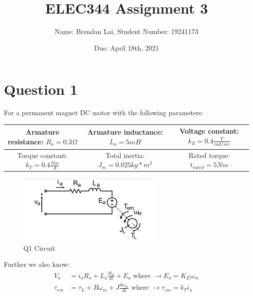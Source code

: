 \documentclass{article}
\title{ELEC344 Assignment 3}
\author{Name: Brendan Lai, Student Number: 19241173}
\date{Due: April 18th, 2021}
\begin{document}
\maketitle
  
\tableofcontents


\section{Question 1}
For a permanent magnet DC motor with the following parameters:
\begin{center}
 \begin{tabular}{| c | c | c |} 
 \hline
 Armature resistance: $R_a = 0.3 \Omega$ & Armature inductance: $L_a = 5mH$ & Voltage constant: $k_E = 0.4 \frac{V}{rad/sec}$ \\ 
 \hline
 Torque constant: $k_T = 0.4 \frac{Nm}{A}$ & Total inertia: $J_m = 0.025 kg*m^2$ & Rated torque: $t_{rated} = 5Nm$\\
 \hline
\end{tabular}
\end{center}
\begin{figure}[H]
    \centering
    \includegraphics[width=0.65\textwidth]{q1-1.png}
    \caption{Q1 Circuit}
\end{figure}
Further we also know:
\begin{align*}
    V_a &= i_a R_a + L_a \frac{di_a}{dt}+E_a \mbox{ where } \longrightarrow E_a = K_E\omega_m\\
    \tau_{em} &= \tau_L + B \omega_m + J \frac{d\omega_m}{dt}\mbox{ where } \longrightarrow \tau_{em} = k_T i_a
\end{align*}
\end{document}
